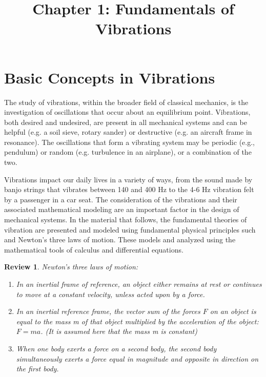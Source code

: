 \documentclass[12pt,letter]{article}
\numberwithin{ex}{section} %
\newtheorem{re}{Review}
\numberwithin{re}{section} %
\newenvironment{review}{\begin{mdframed}[middlelinewidth=2mm,roundcorner=20pt]\begin{re}\normalfont}{\end{re}\end{mdframed}}
\begin{document}
	
	\large{}
	
	\title{\vspace{-2cm} Chapter 1: Fundamentals of Vibrations}
	\date{}
	\maketitle

	\section{Basic Concepts in Vibrations}

    The study of vibrations, within the broader field of classical mechanics, is the investigation of oscillations that occur about an equilibrium point. Vibrations, both desired and undesired, are present in all mechanical systems and can be helpful (e.g. a soil sieve, rotary sander) or destructive (e.g. an aircraft frame in resonance). The oscillations that form a vibrating system may be periodic (e.g., pendulum) or random (e.g. turbulence in an airplane), or a combination of the two. 

    Vibrations impact our daily lives in a variety of ways, from the sound made by banjo strings that vibrates between 140 and 400 Hz to the 4-6 Hz vibration felt by a passenger in a car seat. The consideration of the vibrations and their associated mathematical modeling are an important factor in the design of mechanical systems. In the material that follows, the fundamental theories of vibration are presented and modeled using fundamental physical principles such and Newton's three laws of motion. These models and analyzed using the mathematical tools of calculus and differential equations. 

	\begin{review}
		Newton's three laws of motion:
		\begin{enumerate}
			\item In an inertial frame of reference, an object either remains at rest or continues to move at a constant velocity, unless acted upon by a force.
			\item In an inertial reference frame, the vector sum of the forces $F$ on an object is equal to the mass m of that object multiplied by the acceleration of the object: $F = ma$. (It is assumed here that the mass m is constant)
			\item When one body exerts a force on a second body, the second body simultaneously exerts a force equal in magnitude and opposite in direction on the first body.
		\end{enumerate}
	\end{review}
\end{document}
